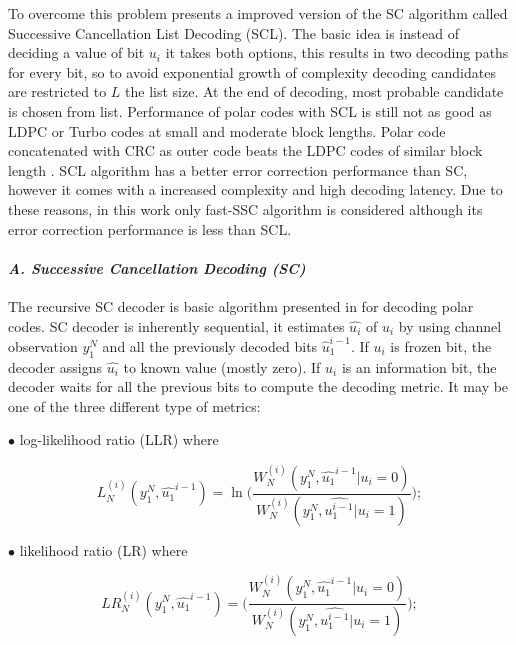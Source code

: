 To overcome this problem \cite{SCL} presents a improved version of the SC algorithm called Successive Cancellation List Decoding (SCL). The basic idea is instead of deciding a value of bit $u_{i}$ it takes both options, this results in two decoding paths for every bit, so to avoid exponential growth of complexity decoding candidates are restricted to $L$ the list size. At the end of decoding, most probable candidate is chosen from list. Performance of polar codes with SCL is still not as good as LDPC or Turbo codes at small and moderate block lengths. Polar code concatenated with CRC as outer code beats the LDPC codes of similar block length \cite{SCL}. SCL algorithm has a better error correction performance than SC, however it comes with a increased complexity and high decoding latency. Due to these reasons, in this work only fast-SSC algorithm is considered although its error correction performance is less than SCL.

\paragraph{\emph{A. Successive Cancellation Decoding (SC)}}  \label{SC}
The recursive SC decoder is basic algorithm presented in \cite{Arikan} for decoding polar codes.  SC decoder is inherently sequential, it estimates $\hat{u_{i}}$ of $u_{i}$ by using channel observation $y^{N}_{1}$ and all the previously decoded bits $\hat{u}_{1}^{i-1}$. If $u_{i}$ is frozen bit, the decoder assigns $\hat{u_{i}}$ to known value (mostly zero). If $u_{i}$ is an information bit, the decoder waits for all the previous bits to compute the decoding metric. It may be one of the three different type of metrics: \newline

$\bullet$ log-likelihood ratio (LLR) where


\begin{equation}
L_{N}^{(i)}(y_{1}^{N},\hat{u_{1}}^{i-1}) = \ln{\Bigg(\frac{W_{N}^{(i)}(y_{1}^{N},\hat{u_{1}}^{i-1}|u_{i} = 0)} {W_{N}^{(i)}(y_{1}^{N},\hat{u_{1}^{i-1}}|u_{i} = 1)}\Bigg)};
\end{equation}

$\bullet$ likelihood ratio (LR) where 

\begin{equation}
LR_{N}^{(i)}(y_{1}^{N},\hat{u_{1}}^{i-1}) = \Bigg(\frac{W_{N}^{(i)}(y_{1}^{N},\hat{u_{1}}^{i-1}|u_{i} = 0)} {W_{N}^{(i)}(y_{1}^{N},\hat{u_{1}^{i-1}}|u_{i} = 1)}\Bigg);
\end{equation}


